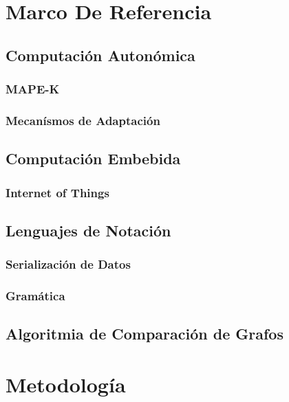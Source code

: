 \documentclass[12pt]{article}
\begin{document}
    \section{Marco De Referencia}

    \subsection{Computación Autonómica}

    \subsubsection{MAPE-K}

    \subsubsection{Mecanísmos de Adaptación}

    \subsection{Computación Embebida}
    
    \subsubsection{Internet of Things}
    
    \subsection{Lenguajes de Notación} %

    \subsubsection{Serialización de Datos}
    
    \subsubsection{Gramática}

    \subsection{Algoritmia de Comparación de Grafos} %

    \section{Metodología}
\end{document}
